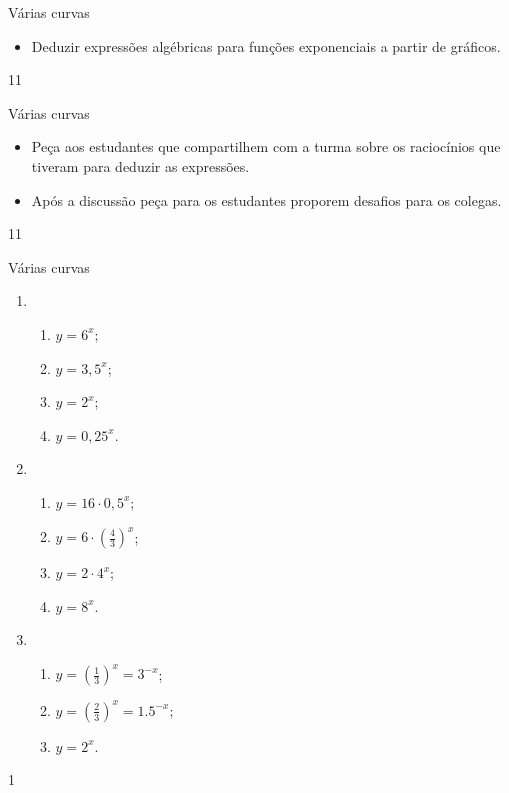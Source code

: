\clearmargin
\begin{objectives}{Várias curvas}
{
\begin{itemize}
\item Deduzir expressões algébricas para funções exponenciais a partir de gráficos.

\end{itemize}
}{1}{1}
\end{objectives}
\begin{sugestions}{Várias curvas}
{
\begin{itemize}

\item Peça aos estudantes que compartilhem com a turma sobre os raciocínios que tiveram para deduzir as expressões.

\item Após a discussão peça para os estudantes proporem desafios para os colegas.

\end{itemize}
}{1}{1}
\end{sugestions}
\begin{answer}{Várias curvas}
{
\begin{enumerate}

\item \begin{enumerate}[label=(\arabic*)]
\item $y=6^x$; 
\item $y=3{,}5^x$;
\item $y=2^x$;
\item $y=0{,}25^x$.
\end{enumerate}

\item \begin{enumerate}[label=(\arabic*)]
\item $y=16 \cdot 0{,}5^x$; 
\item $y=6\cdot \left(\frac 43\right)^x$; 
\item $y=2\cdot 4^x$; 
\item $y=8^x$.
\end{enumerate}

\item \begin{enumerate}[label=(\arabic*)]
\item $y=\left(\frac 13\right)^x=3^{-x}$; 
\item $y=\left(\frac 23\right)^x=1.5^{-x}$; 
\item $y=2^x$.
\end{enumerate}


\end{enumerate}
}{1}
\end{answer}

